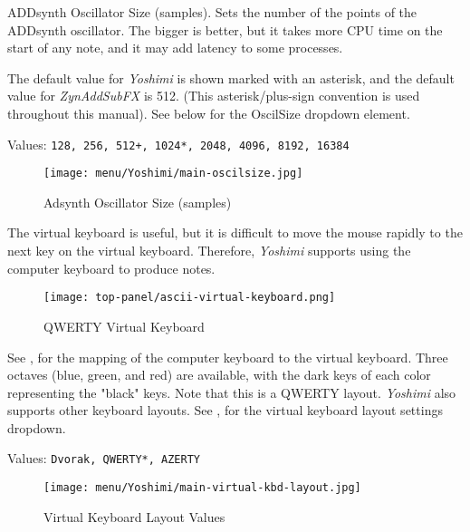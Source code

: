    \setcounter{ItemCounter}{0}      %

   ADDsynth Oscillator Size (samples).
   Sets the number of the points of the ADDsynth oscillator. The
   bigger is better, but it takes more CPU time on the start of any note,
   and it may add latency to some processes.

   The default value for \textsl{Yoshimi} is shown marked with an asterisk,
   and the default value for \textsl{ZynAddSubFX} is 512.
   (This asterisk/plus-sign convention is used throughout this manual).
   See  below for the OscilSize
   dropdown element.

   Values: \texttt{128, 256, 512+, 1024*, 2048, 4096, 8192, 16384}

\begin{figure}[H]
   \centering 
   \texttt{[image: menu/Yoshimi/main-oscilsize.jpg]}
   \caption[OscilSize Values]{Adsynth Oscillator Size (samples)}
   \label{fig:yoshimi_oscilsize_values}
\end{figure}

   The virtual keyboard is useful, but it is difficult to move the mouse
   rapidly to the next key on the virtual keyboard.
   Therefore, \textsl{Yoshimi} supports using the computer keyboard
   to produce notes.

\begin{figure}[H]
   \centering 
   \texttt{[image: top-panel/ascii-virtual-keyboard.png]}
   \caption{QWERTY Virtual Keyboard}
   \label{fig:qwerty_virtual_keyboard}
\end{figure}

   See ,
   for the mapping of the computer keyboard to the
   virtual keyboard.
   Three octaves (blue, green, and red) are available, with the dark keys of
   each color representing the "black" keys.
   Note that this is a QWERTY layout.  
   \textsl{Yoshimi} also supports other keyboard layouts.
   See ,
   for the virtual keyboard
   layout settings dropdown.

   Values: \texttt{Dvorak, QWERTY*, AZERTY}

\begin{figure}[H]
   \centering 
   \texttt{[image: menu/Yoshimi/main-virtual-kbd-layout.jpg]}
   \caption[Virtual Keyboard Layout]{Virtual Keyboard Layout Values}
   \label{fig:virtual_kbd_layout} 
\end{figure}

